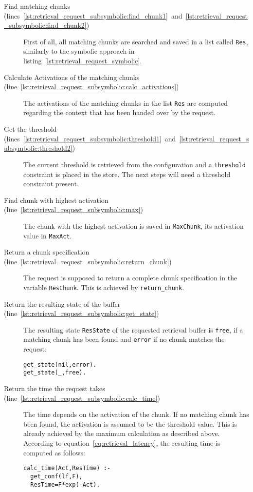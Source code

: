 \begin{description}
 \item[Find matching chunks (lines~\ref{lst:retrieval_request_subsymbolic:find_chunk1}~and~\ref{lst:retrieval_request_subsymbolic:find_chunk2})] First of all, all matching chunks are searched and saved in a list called \lstinline|Res|, similarly to the symbolic approach in listing~\ref{lst:retrieval_request_symbolic}.
 \item[Calculate Activations of the matching chunks (line~\ref{lst:retrieval_request_subsymbolic:calc_activations})] The activations of the matching chunks in the list \lstinline|Res| are computed regarding the context that has been handed over by the request.
 \item[Get the threshold (lines~\ref{lst:retrieval_request_subsymbolic:threshold1}~and~\ref{lst:retrieval_request_subsymbolic:threshold2})] The current threshold is retrieved from the configuration and a \lstinline|threshold| constraint is placed in the store. The next steps will need a threshold constraint present.
 \item[Find chunk with highest activation (line~\ref{lst:retrieval_request_subsymbolic:max})] The chunk with the highest activation is saved in \lstinline|MaxChunk|, its activation value in \lstinline|MaxAct|.
 \item[Return a chunk specification (line~\ref{lst:retrieval_request_subsymbolic:return_chunk})] The request is supposed to return a complete chunk specification in the variable \lstinline|ResChunk|. This is achieved by \lstinline|return_chunk|.
 \item[Return the resulting state of the buffer (line~\ref{lst:retrieval_request_subsymbolic:get_state})] The resulting state \lstinline|ResState| of the requested retrieval buffer is \lstinline|free|, if a matching chunk has been found and \lstinline|error| if no chunk matches the request:
 
\begin{lstlisting}
get_state(nil,error).
get_state(_,free).
\end{lstlisting}

 \item[Return the time the request takes (line~\ref{lst:retrieval_request_subsymbolic:calc_time})] The time depends on the activation of the chunk. If no matching chunk has been found, the activation is assumed to be the threshold value. This is already achieved by the maximum calculation as described above. According to equation~\eqref{eq:retrieval_latency}, the resulting time is computed as follows:
 
\begin{lstlisting}
calc_time(Act,ResTime) :-
  get_conf(lf,F),
  ResTime=F*exp(-Act). 
\end{lstlisting}
\end{description}

